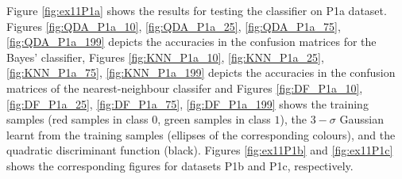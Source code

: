 \documentclass[11pt, a4 paper]{article}
\begin{document}
Figure \ref{fig:ex11P1a} shows the results for testing the classifier on P1a dataset. Figures \ref{fig:QDA_P1a_10}, \ref{fig:QDA_P1a_25}, \ref{fig:QDA_P1a_75}, \ref{fig:QDA_P1a_199} depicts the accuracies in the confusion matrices for the Bayes' classifier, Figures \ref{fig:KNN_P1a_10}, \ref{fig:KNN_P1a_25}, \ref{fig:KNN_P1a_75}, \ref{fig:KNN_P1a_199} depicts the accuracies in the confusion matrices of the nearest-neighbour classifer and Figures \ref{fig:DF_P1a_10}, \ref{fig:DF_P1a_25}, \ref{fig:DF_P1a_75}, \ref{fig:DF_P1a_199} shows the training samples (red samples in class $0$, green samples in class $1$), the $3-\sigma$ Gaussian learnt from the training samples (ellipses of the corresponding colours), and the quadratic discriminant function (black). Figures \ref{fig:ex11P1b} and \ref{fig:ex11P1c} shows the corresponding figures for datasets P1b and P1c, respectively.
\end{document}

